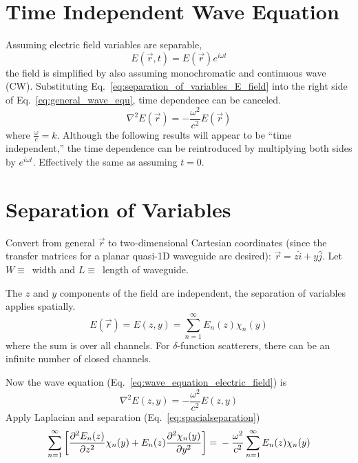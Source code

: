 \section{Time Independent Wave Equation}
Assuming electric field variables are separable,
\begin{equation}
E(\vec{r},t) = E(\vec{r}) e^{i\omega t}
\label{eq:separation_of_variables_E_field}
\end{equation}
the field is simplified by also assuming monochromatic and continuous wave (CW). Substituting  Eq.~\ref{eq:separation_of_variables_E_field} into the right side of Eq.~\ref{eq:general_wave_equ}, time dependence can be canceled. 
\begin{equation}
\nabla^2 E(\vec{r}) = - \frac{\omega^2}{c^2} E(\vec{r})
\label{eq:wave_equation_electric_field}
\end{equation}
where $\frac{\omega}{c}=k$. Although the following results will appear to be ``time independent,'' the time dependence can be reintroduced by multiplying both sides by $e^{i\omega t}$. Effectively the same as assuming $t=0$. 


\section{Separation of Variables}
Convert from general $\vec{r}$ to two-dimensional Cartesian coordinates (since the transfer matrices for a planar quasi-1D waveguide are desired): $\vec{r} = z \hat{i}+y\hat{j}$. Let $W\equiv$~width and $L\equiv$~length of waveguide.

The $z$ and $y$ components of the field are independent, the separation of variables applies spatially.
\begin{equation}
E(\vec{r}) = E(z,y) = \sum^\infty_{n=1} E_n(z) \chi_n(y)
\label{eq:spacialseparation}
\end{equation}
where the sum is over all channels. For $\delta$-function scatterers, there can be an infinite number of closed channels.

Now the wave equation (Eq.~\ref{eq:wave_equation_electric_field}) is 
\begin{equation}
\nabla^2 E(z,y) = - \frac{\omega^2}{c^2} E(z,y)
\label{eq:wave_equation_electric_field_cartesian}
\end{equation}
Apply Laplacian %
and separation (Eq.~\ref{eq:spacialseparation})
\begin{equation}
\sum^\infty_{n=1} \left[ \frac{\partial^2E_n(z)}{\partial z^2} \chi_n(y) + E_n(z) \frac{\partial^2 \chi_n(y)}{\partial y^2} \right] = \\
- \frac{\omega^2}{c^2} \sum^\infty_{n=1} E_n(z) \chi_n(y)
\label{eq:summation_variable_separation_cartesian}
\end{equation}

